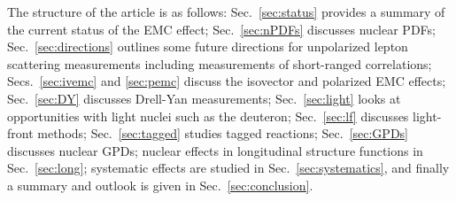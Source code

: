 The structure of the article is as follows: Sec.~\ref{sec:status} provides a summary of the current status of the EMC effect; Sec.~\ref{sec:nPDFs} discusses nuclear PDFs; Sec.~\ref{sec:directions} outlines some future directions for unpolarized lepton scattering measurements including measurements of short-ranged correlations; Secs.~\ref{sec:ivemc} and \ref{sec:pemc} discuss the isovector and polarized EMC effects; Sec.~\ref{sec:DY} discusses Drell-Yan measurements; Sec.~\ref{sec:light} looks at opportunities with light nuclei such as the deuteron; Sec.~\ref{sec:lf} discusses light-front methods; Sec.~\ref{sec:tagged} studies tagged reactions; Sec.~\ref{sec:GPDs} discusses nuclear GPDs;  nuclear effects in longitudinal structure functions in Sec.~\ref{sec:long}; systematic effects are studied in Sec.~\ref{sec:systematics}, and finally a summary and outlook is given in Sec.~\ref{sec:conclusion}.
